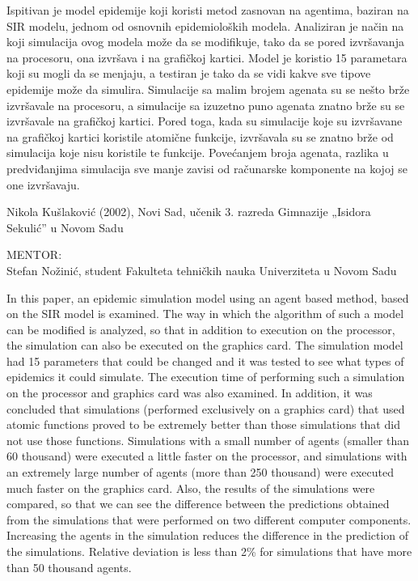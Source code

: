 \begin{Abstract}
Ispitivan je model epidemije koji koristi metod zasnovan na agentima, baziran na SIR modelu, jednom od osnovnih epidemioloških modela. Analiziran je način na koji simulacija ovog modela može da se modifikuje, tako da se pored izvršavanja na procesoru, ona izvršava i na grafičkoj kartici. Model je koristio 15 parametara koji su mogli da se menjaju, a testiran je tako da se vidi kakve sve tipove epidemije može da simulira. Simulacije sa malim brojem agenata su se nešto brže izvršavale na procesoru, a simulacije sa izuzetno puno agenata znatno brže su se izvršavale na grafičkoj kartici. Pored toga, kada su simulacije koje su izvršavane na grafičkoj kartici koristile atomične funkcije, izvršavala su se znatno brže od simulacija koje nisu koristile te funkcije. Povećanjem broja agenata, razlika u predviđanjima simulacija sve manje zavisi od računarske komponente na kojoj se one izvršavaju.

\end{Abstract}
\begin{AuthorEx}
Nikola Kušlaković (2002), Novi Sad, učenik 3. razreda Gimnazije „Isidora Sekulić” u Novom Sadu

MENTOR:\\
Stefan Nožinić, student Fakulteta tehničkih nauka Univerziteta u Novom Sadu
\end{AuthorEx}
\begin{AbstractEng}
In this paper, an epidemic simulation model using an agent based method, based on the SIR model is examined. The way in which the algorithm of such a model can be modified is analyzed, so that in addition to execution on the processor, the simulation can also be executed on the graphics card. The simulation model had 15 parameters that could be changed and it was tested to see what types of epidemics it could simulate. The execution time of performing such a simulation on the processor and graphics card was also examined. In addition, it was concluded that simulations (performed exclusively on a graphics card) that used atomic functions proved to be extremely better than those simulations that did not use those functions. Simulations with a small number of agents (smaller than 60 thousand) were executed a little faster on the processor, and simulations with an extremely large number of agents (more than 250 thousand) were executed much faster on the graphics card. Also, the results of the simulations were compared, so that we can see the difference between the predictions obtained from the simulations that were performed on two different computer components. Increasing the agents in the simulation reduces the difference in the prediction of the simulations. Relative deviation is less than 2\% for simulations that have more than 50 thousand agents.
\end{AbstractEng}


